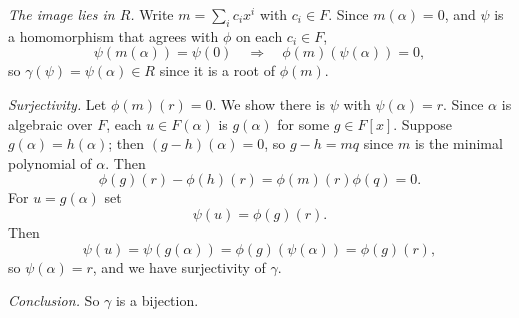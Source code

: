 \documentclass[11pt]{article}
\begin{document}
\emph{The image lies in $R$.} Write $m=\sum_i c_i x^i$ with $c_i\in F$. Since $m(\alpha)=0$, and $\psi$ is a homomorphism that agrees with $\phi$ on each $c_i\in F$,
\[
\psi(m(\alpha))=\psi(0)\quad\Longrightarrow\quad\phi(m)(\psi(\alpha))=0,
\]
so $\gamma(\psi)=\psi(\alpha)\in R$ since it is a root of $\phi(m)$.

\emph{Surjectivity.} Let $\phi(m)(r)=0$. We show there is $\psi$ with $\psi(\alpha)=r$. Since $\alpha$ is algebraic over $F$, each $u\in F(\alpha)$ is $g(\alpha)$ for some $g\in F[x]$. Suppose $g(\alpha)=h(\alpha)$; then $(g-h)(\alpha)=0$, so $g-h=mq$ since $m$ is the minimal polynomial of $\alpha$. Then
\[
\phi(g)(r)-\phi(h)(r)=\phi(m)(r)\phi(q)=0.
\]
For $u=g(\alpha)$ set
\[
\psi(u)=\phi(g)(r).
\]
Then
\[
\psi(u)=\psi(g(\alpha))=\phi(g)(\psi(\alpha))=\phi(g)(r),
\]
so $\psi(\alpha)=r$, and we have surjectivity of $\gamma$.

\emph{Conclusion.} So $\gamma$ is a bijection.
\end{document}
